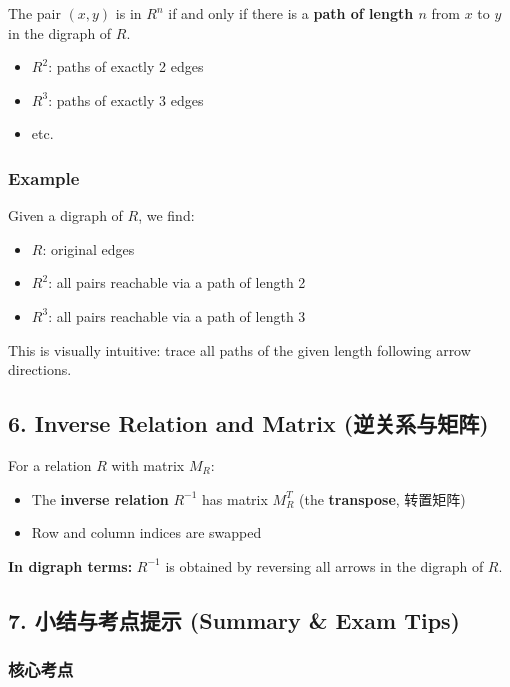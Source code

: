 \documentclass[10pt,a4paper,openany]{ctexbook}
\theoremstyle{definition}
\theoremstyle{remark}
\begin{document}
The pair $(x,y)$ is in $R^n$ if and only if there is a \textbf{path of length $n$} from $x$ to $y$ in the digraph of $R$.
\begin{itemize}
\item $R^2$: paths of exactly 2 edges
\item $R^3$: paths of exactly 3 edges
\item etc.

\end{itemize}

\subsubsection{Example}

Given a digraph of $R$, we find:
\begin{itemize}
\item $R$: original edges
\item $R^2$: all pairs reachable via a path of length 2
\item $R^3$: all pairs reachable via a path of length 3

\end{itemize}

This is visually intuitive: trace all paths of the given length following arrow directions.
\vspace{-2pt}

\subsection{6. Inverse Relation and Matrix (逆关系与矩阵)}

For a relation $R$ with matrix $M_R$:
\begin{itemize}
\item The \textbf{inverse relation} $R^{-1}$ has matrix $M_R^T$ (the \textbf{transpose}, 转置矩阵)
\item Row and column indices are swapped

\end{itemize}

\textbf{In digraph terms:} $R^{-1}$ is obtained by reversing all arrows in the digraph of $R$.
\vspace{-2pt}

\subsection{7. 小结与考点提示 (Summary \& Exam Tips)}

\subsubsection{核心考点}
\end{document}
